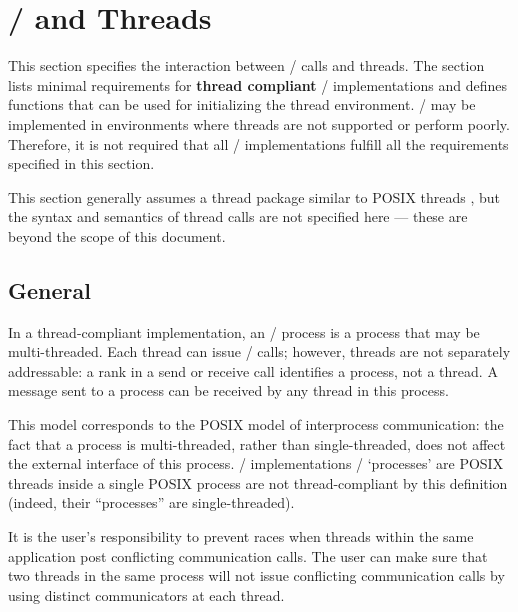 \section{\texorpdfstring{\MPI/}{MPI} and Threads}
\label{sec:ei-threads}

This section specifies the interaction between \MPI/ calls and threads.
The section lists minimal requirements for 
{\bf thread compliant}  \MPI/ implementations 
and defines functions that can
be used for initializing the thread environment.  
\MPI/ may be implemented in environments where threads
are not supported or perform poorly.  Therefore, it is not required
that all \MPI/ implementations fulfill all the requirements specified
in this section.

This section
generally assumes a thread package similar to 
POSIX threads \cite{posix-1003.1}, but the 
syntax and semantics of thread calls are not specified here ---
these are beyond the scope of this document.  

\subsection{General}

In a thread-compliant implementation, an \MPI/ process is a process
that may be multi-threaded.
Each thread can issue \MPI/ calls; however, threads are not
separately addressable: a rank in a send or receive call identifies a
process, not a thread.  A message sent to a process can be received by
any thread in this process.

\begin{rationale}
This model corresponds to the POSIX model of interprocess
communication: the fact that a process is multi-threaded, rather than
single-threaded, does not affect the external interface of this
process.  
\MPI/ implementations  \MPI/ `processes' are POSIX threads
inside a single POSIX process are not thread-compliant by this
definition (indeed, their ``processes'' are single-threaded).
\end{rationale}

\begin{users}
It is the user's responsibility to prevent races when threads within the
same application post conflicting communication calls.  The user can
make sure that two threads in the same process will not issue
conflicting communication calls by using distinct communicators at each
thread.
\end{users}

